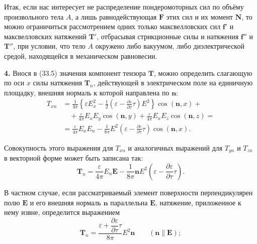\documentclass[a4paper,10pt]{article}
\begin{document}
Итак, если нас интересует не распределение пондеромоторных сил
по объёму произвольного тела $A$, а лишь равнодействующая $\mathbf{F}$
этих сил и их момент $\mathbf{N}$, то можно ограничиться рассмотрением
одних только максвелловских сил $\mathbf{f}'$ и максвелловских натяжений
$\mathbf{T}'$, отбрасывая стрикционные силы и натяжения $\mathbf{f}''$
и $\mathbf{T}''$, при условии, что тело $A$ окружено либо вакуумом,
либо диэлектрической средой, находящейся в механическом равновесии.

\textbf{4.} Внося в (33.5) значения компонент тензора $\mathbf{T}$,
можно определить слагающую по оси $x$ силы натяжения $\mathbf{T}_n$,
действующей в электрическом поле на единичную площадку, внешняя
нормаль к которой направлена по $\mathbf{n}$:
\begin{align*}
    T_{xn} &= \frac{1}{4\pi}\left\{\varepsilon E_x^2
            - \frac{1}{2}\left(\varepsilon - \frac{\partial\varepsilon}{\partial\tau}\tau\right)E^2
            \right\}\cos(\mathbf{n},x) + \\
           &\quad + \frac{\varepsilon}{4\pi}E_x E_y\cos(\mathbf{n},y)
            + \frac{\varepsilon}{4\pi}E_x E_z\cos(\mathbf{n},z) = \\
           &= \frac{\varepsilon}{4\pi}E_x E_n
            - \frac{1}{8\pi}E^2\!\left(\varepsilon
            - \frac{\partial\varepsilon}{\partial\tau}\tau\right)\cos(\mathbf{n},x).
\end{align*}


Совокупность этого выражения для $T_{xn}$ и аналогичных выражений
для $T_{yn}$ и $T_{zn}$ в векторной форме может быть записана так:
\begin{equation}
    \mathbf{T}_n = \frac{\varepsilon}{4\pi}E_n\mathbf{E}
                 - \frac{1}{8\pi}\mathbf{n}E^2\!\left(
                     \varepsilon - \frac{\partial\varepsilon}{\partial\tau}\tau
                   \right).
    \tag{34.5}
\end{equation}

В частном случае, если рассматриваемый элемент поверхности
перпендикулярен полю $\mathbf{E}$ и его внешняя нормаль $\mathbf{n}$
параллельна $\mathbf{E}$, натяжение, приложенное к нему извне,
определится выражением
\begin{equation}
    \mathbf{T}_n = \frac{\varepsilon + \dfrac{\partial\varepsilon}{\partial\tau}\tau}{8\pi}
                   E^2\mathbf{n}
    \qquad (\mathbf{n} \parallel \mathbf{E});
    \tag{34.6}
\end{equation}
\end{document}
